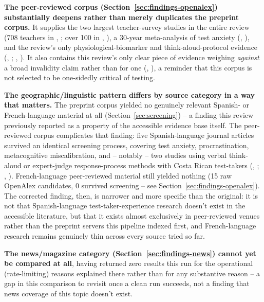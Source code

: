 \documentclass[11pt]{article}
\begin{document}
\textbf{The peer-reviewed corpus (Section~\ref{sec:findings-openalex}) substantially deepens rather than merely duplicates the preprint corpus.} It supplies the two largest teacher-survey studies in the entire review (708 teachers in \citeauthor{jones2004voices}, \citeyear{jones2004voices}; over 100 in \citeauthor{gordon1997price}, \citeyear{gordon1997price}), a 30-year meta-analysis of test anxiety (\citeauthor{vonderembse2017metaanalysis}, \citeyear{vonderembse2017metaanalysis}), and the review's only physiological-biomarker and think-aloud-protocol evidence (\citeauthor{heissel2019physio}, \citeyear{heissel2019physio}; \citeauthor{brizuela2016autorreportes}, \citeyear{brizuela2016autorreportes}). It also contains this review's only clear piece of evidence weighing \emph{against} a broad invalidity claim rather than for one (\citeauthor{sackett2008validity}, \citeyear{sackett2008validity}), a reminder that this corpus is not selected to be one-sidedly critical of testing.

\textbf{The geographic/linguistic pattern differs by source category in a way that matters.} The preprint corpus yielded no genuinely relevant Spanish- or French-language material at all (Section~\ref{sec:screening}) -- a finding this review previously reported as a property of the accessible evidence base itself. The peer-reviewed corpus complicates that finding: five Spanish-language journal articles survived an identical screening process, covering test anxiety, procrastination, metacognitive miscalibration, and -- notably -- two studies using verbal think-aloud or expert-judge response-process methods with Costa Rican test-takers (\citeauthor{brizuela2016autorreportes}, \citeyear{brizuela2016autorreportes}; \citeauthor{jimenez2018validacion}, \citeyear{jimenez2018validacion}). French-language peer-reviewed material still yielded nothing (15 raw OpenAlex candidates, 0 survived screening -- see Section~\ref{sec:findings-openalex}). The corrected finding, then, is narrower and more specific than the original: it is not that Spanish-language test-taker-experience research doesn't exist in the accessible literature, but that it exists almost exclusively in peer-reviewed venues rather than the preprint servers this pipeline indexed first, and French-language research remains genuinely thin across every source tried so far.

\textbf{The news/magazine category (Section~\ref{sec:findings-news}) cannot yet be compared at all}, having returned zero results this run for the operational (rate-limiting) reasons explained there rather than for any substantive reason -- a gap in this comparison to revisit once a clean run succeeds, not a finding that news coverage of this topic doesn't exist.
\end{document}
